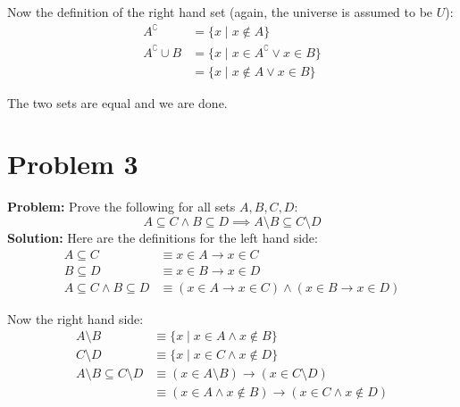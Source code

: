 \documentclass{article}
\begin{document}
Now the definition of the right hand set (again, the universe is assumed to be $U$):
\begin{align*}
  A^\complement&=\{x\mid x\not\in A\}\\
  A^\complement\cup B&=\{x\mid x\in A^\complement\vee x\in B\}\\
  &=\{x\mid x\not\in A\vee x\in B\}
\end{align*}

The two sets are equal and we are done.

\section*{Problem 3}
\textbf{Problem:} Prove the following for all sets $A,B,C,D$:
$$A\subseteq C \wedge B\subseteq D \implies A\setminus B\subseteq C\setminus D$$
\textbf{Solution:} Here are the definitions for the left hand side:
\begin{align*}
  A\subseteq C&\equiv x\in A\rightarrow x\in C\\
  B\subseteq D&\equiv x\in B\rightarrow x\in D\\
  A\subseteq C \wedge B\subseteq D&\equiv (x\in A\rightarrow x\in C)\wedge (x\in B\rightarrow x\in D)
\end{align*}

Now the right hand side:
\begin{align*}
  A\setminus B&\equiv \{x\mid x\in A\wedge x\not\in B\}\\
  C\setminus D&\equiv \{x\mid x\in C\wedge x\not\in D\}\\
  A\setminus B\subseteq C\setminus D&\equiv (x\in A\setminus B) \rightarrow (x\in C\setminus D)\\
  &\equiv (x\in A\wedge x\not\in B)\rightarrow(x\in C\wedge x\not\in D)
\end{align*}
\end{document}

